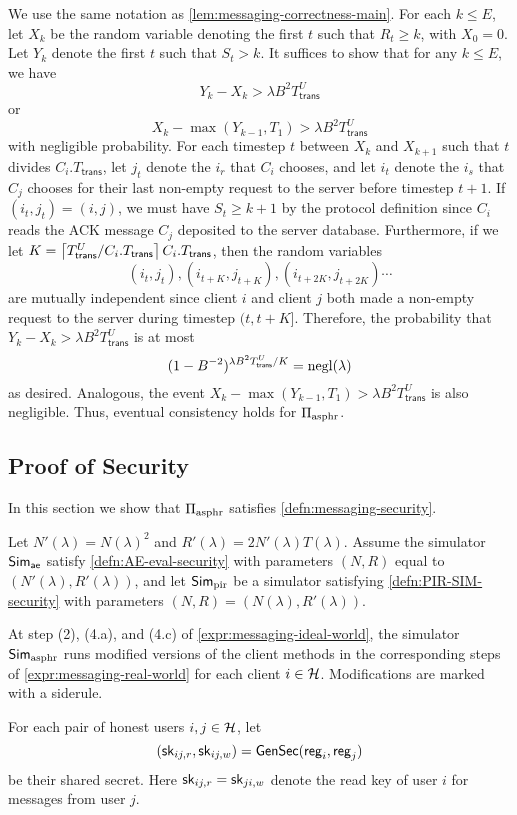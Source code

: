  We use the same notation as \cref{lem:messaging-correctness-main}. For each $k \leq E$, let $X_k$ be the random variable denoting the first $t$ such that $R_t \geq k$, with $X_0 = 0$. Let $Y_k$ denote the first $t$ such that $S_{t} > k$. It suffices to show that for any $k \leq E$, we have
 $$Y_k - X_k > \lambda B^2 T^U_{\mathsf{trans}}$$
 or
 $$X_{k} - \max(Y_{k - 1}, T_1) > \lambda B^2 T^U_{\mathsf{trans}}$$
 with negligible probability. For each timestep $t$ between $X_k$ and $X_{k + 1}$ such that $t$ divides $C_i.T_{\mathsf{trans}}$, let $j_t$ denote the $i_r$ that $C_i$ chooses, and let $i_t$ denote the $i_s$ that $C_j$ chooses for their last non-empty request to the server before timestep $t + 1$. If $(i_t, j_t) = (i, j)$, we must have $S_{t} \geq k + 1$ by the protocol definition since $C_i$ reads the ACK message $C_j$ deposited to the server database. Furthermore, if we let $K = \left\lceil T^U_{\mathsf{trans}} / C_i.T_{\mathsf{trans}} \right\rceil C_i.T_{\mathsf{trans}}$, then the random variables
 $$(i_t, j_t), (i_{t + K}, j_{t + K}), (i_{t + 2K}, j_{t + 2K})\cdots$$
are mutually independent since client $i$ and client $j$ both made a non-empty request to the server during timestep $(t, t + K]$. Therefore, the probability that $Y_k - X_k > \lambda B^2 T^U_{\mathsf{trans}}$ is at most
$$(1 - B^{-2})^{\lambda B^2 T^U_{\mathsf{trans}} / K} = \operatorname{negl}(\lambda)$$
as desired. Analogous, the event $X_{k} - \max(Y_{k - 1}, T_1) > \lambda B^2 T^U_{\mathsf{trans}}$ is also negligible. Thus, eventual consistency holds for $\Pi_{\text{asphr}}$.
\subsection{Proof of Security}
In this section we show that $\Pi_{\text{asphr}}$ satisfies \cref{defn:messaging-security}. 

Let $N'(\lambda) = N(\lambda)^2$ and $R'(\lambda) = 2N'(\lambda)T(\lambda)$. Assume the simulator $\mathsf{Sim}_{\mathsf{ae}}$ satisfy \cref{defn:AE-eval-security} with parameters $(N, R)$ equal to $(N'(\lambda), R'(\lambda))$, and let $\mathsf{Sim}_{\text{pir}}$ be a simulator satisfying \cref{defn:PIR-SIM-security} with parameters $(N, R) = (N(\lambda), R'(\lambda))$. 

At step (2), (4.a), and (4.c) of \cref{expr:messaging-ideal-world}, the simulator $\mathsf{Sim}_{\text{asphr}}$ runs modified versions of the client methods in the corresponding steps of \cref{expr:messaging-real-world} for each client $i \in \mathcal{H}$. Modifications are marked with a siderule. 

For each pair of honest users $i, j \in \mathcal{H}$, let 
$$({\mathsf{sk}}_{ij, r}, {\mathsf{sk}}_{ij, w}) = \mathsf{GenSec}(\mathsf{reg}_i, \mathsf{reg}_j)$$ 
be their shared secret. Here ${\mathsf{sk}}_{ij, r} = {\mathsf{sk}}_{ji, w}$ denote the read key of user $i$ for messages from user $j$.

